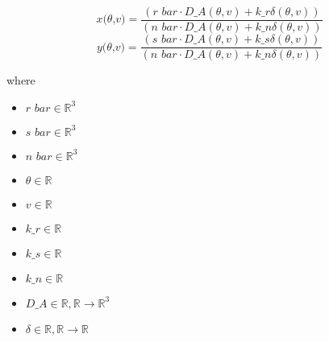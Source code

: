 \documentclass[12pt]{article}
\begin{document}
\[
\textit{x(θ,v)} = \frac{(\textit{r bar} \cdot \textit{D\_A}(\textit{θ},\textit{v}) + \textit{k\_r}\textit{δ}(\textit{θ},\textit{v}))}{(\textit{n bar} \cdot \textit{D\_A}(\textit{θ},\textit{v}) + \textit{k\_n}\textit{δ}(\textit{θ},\textit{v}))}
\]
\[
\textit{y(θ,v)} = \frac{(\textit{s bar} \cdot \textit{D\_A}(\textit{θ},\textit{v}) + \textit{k\_s}\textit{δ}(\textit{θ},\textit{v}))}{(\textit{n bar} \cdot \textit{D\_A}(\textit{θ},\textit{v}) + \textit{k\_n}\textit{δ}(\textit{θ},\textit{v}))}
\]

where
\begin{itemize}
\item $\textit{r bar} \in \mathbb{R}^{ 3}$
\item $\textit{s bar} \in \mathbb{R}^{ 3}$
\item $\textit{n bar} \in \mathbb{R}^{ 3}$
\item $\textit{θ} \in \mathbb{{R}}$
\item $\textit{v} \in \mathbb{{R}}$
\item $\textit{k\_r} \in \mathbb{{R}}$
\item $\textit{k\_s} \in \mathbb{{R}}$
\item $\textit{k\_n} \in \mathbb{{R}}$
\item $\textit{D\_A} \in \mathbb{{R}},\mathbb{{R}}\rightarrow \mathbb{R}^{ 3}$
\item $\textit{δ} \in \mathbb{{R}},\mathbb{{R}}\rightarrow \mathbb{{R}}$
\end{itemize}
\end{document}
